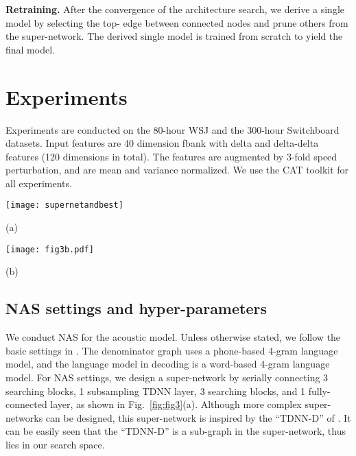 \documentclass{article}
\newcommand{\figref}{Fig.~\ref}
\begin{document}
\textbf{Retraining.}
After the convergence of the architecture search, we derive a single model by selecting the top- edge between connected nodes and prune others from the super-network.
The derived single model is trained from scratch to yield the final model.

\vspace{-3mm}
\section{Experiments}
\label{sec:exp}
\vspace{-1mm}
Experiments are conducted on the 80-hour WSJ and the 300-hour Switchboard datasets. Input features are 40 dimension fbank with delta and delta-delta features (120 dimensions in total). The features are augmented by 3-fold speed perturbation, and are mean and variance normalized.
We use the CAT toolkit \cite{an2020cat} for all experiments.
\begin{figure*}[t]
    \begin{minipage}[t]{1.0\linewidth}
        \centering
        \texttt{[image: supernetandbest]}
\centerline{(a)}\medskip
    \end{minipage}
\begin{minipage}[b]{1.0\linewidth}
        \centering
        \texttt{[image: fig3b.pdf]}
\centerline{(b)}\medskip
    \end{minipage}
\vspace{-8mm}
    \caption{(a) shows the super-network for WSJ experiments. Labels of candidate operations over edges are formatted in ``-\{half of context\}-\{dilation\}''. In Switchboard experiments, we add extra ``TDNN-3-1'' and ``TDNN-3-2'' candidate operations to each searching blocks. The solid lines in (a) indicate one of the derived single model from the 5 runs of NAS on WSJ.
        (b) shows the evolution of architecture probabilities (i.e., ) for the searching blocks in the NAS run that yields the derived single model in (a).}
    \label{fig:fig3}
\vspace{-6mm}
\end{figure*}
\vspace{-2mm}
\subsection{NAS settings and hyper-parameters}
\label{sec:exp:settings}
We conduct NAS for the acoustic model.
Unless otherwise stated, we follow the basic settings in \cite{xiang2019crf}.
The denominator graph uses a phone-based 4-gram language model, and the language model in decoding is a word-based 4-gram language model.
For NAS settings, we design a super-network by serially connecting 3 searching blocks, 1 subsampling TDNN layer, 3 searching blocks, and 1 fully-connected layer, as shown in \figref{fig:fig3}(a). Although more complex super-networks can be designed, this super-network is inspired by the ``TDNN-D'' of \cite{peddinti2018low}. It can be easily seen that the ``TDNN-D'' is a sub-graph in the super-network, thus lies in our search space.
\end{document}
